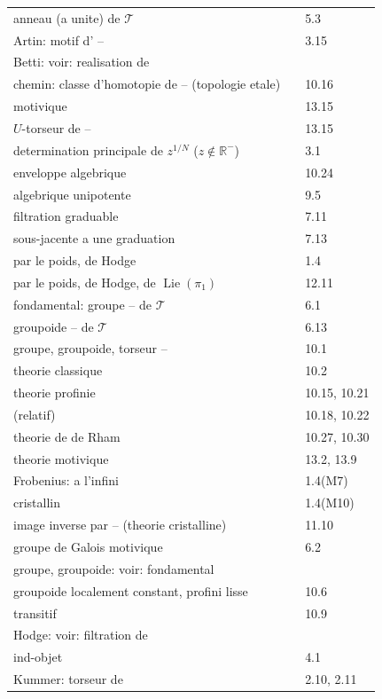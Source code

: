 \documentclass[12pt,a4paper]{article}
\theoremstyle{plain}
\theoremstyle{definition}
\theoremstyle{remark}
\DeclareMathOperator{\Lie}{Lie}
\newcommand{\RR}{\mathbb{R}}
\begin{document}
\begin{tabular}{lll}
anneau (a unite) de $\mathcal{T}$ & & 5.3 \\
Artin: motif d' -- & & 3.15 \\
Betti: voir: realisation de & & \\
chemin: classe d'homotopie de -- (topologie etale) & & 10.16 \\
\quad motivique & & 13.15 \\
\quad $U$-torseur de -- & & 13.15 \\
determination principale de $z^{1/N}$ ($z \notin \RR^-$) & & 3.1 \\
enveloppe algebrique & & 10.24 \\
\quad algebrique unipotente & & 9.5 \\
filtration graduable & & 7.11 \\
\quad sous-jacente a une graduation & & 7.13 \\
\quad par le poids, de Hodge & & 1.4 \\
\quad par le poids, de Hodge, de $\Lie(\pi_1)$ & & 12.11 \\
fondamental: groupe -- de $\mathcal{T}$ & & 6.1 \\
\quad groupoide -- de $\mathcal{T}$ & & 6.13 \\
groupe, groupoide, torseur -- & & 10.1 \\
\quad theorie classique & & 10.2 \\
\quad theorie profinie & & 10.15, 10.21 \\
\quad \quad (relatif) & & 10.18, 10.22 \\
\quad theorie de de Rham & & 10.27, 10.30 \\
\quad theorie motivique & & 13.2, 13.9 \\
Frobenius: a l'infini & & 1.4(M7) \\
\quad cristallin & & 1.4(M10) \\
\quad image inverse par -- (theorie cristalline) & & 11.10 \\
groupe de Galois motivique & & 6.2 \\
groupe, groupoide: voir: fondamental & & \\
groupoide localement constant, profini lisse & & 10.6 \\
\quad transitif & & 10.9 \\
Hodge: voir: filtration de & & \\
ind-objet & & 4.1 \\
Kummer: torseur de & & 2.10, 2.11 \\

\end{tabular}
\end{document}
